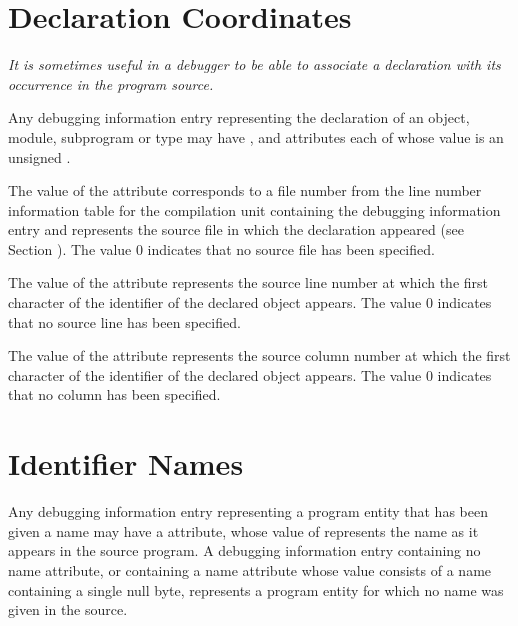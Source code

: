 \section{Declaration Coordinates}
\label{chap:declarationcoordinates}
\textit{It is sometimes useful in a debugger to be able to associate
a declaration with its occurrence in the program source.}

Any debugging information 
\hypertarget{chap:DWATdeclfilefilecontainingsourcedeclaration}{}
entry 
\hypertarget{chap:DWATdecllinelinenumberofsourcedeclaration}{}
representing 
\hypertarget{chap:DWATdeclcolumncolumnpositionofsourcedeclaration}{}
the
declaration of an object, module, subprogram or
type 
may 
have
\DWATdeclfile, 
\DWATdeclline{} and 
\DWATdeclcolumn{}
attributes each of whose value is an unsigned
.

The value of 
the 
\DWATdeclfile{}
attribute 
corresponds to
a file number from the line number information table for the
compilation unit containing the debugging information entry and
represents the source file in which the declaration appeared
(see Section ). 
The value 0 indicates that no source file
has been specified.

The value of 
the \DWATdeclline{} attribute represents
the source line number at which the first character of
the identifier of the declared object appears. The value 0
indicates that no source line has been specified.

The value of 
the \DWATdeclcolumn{} attribute represents
the source column number at which the first character of
the identifier of the declared object appears. The value 0
indicates that no column has been specified.

\section{Identifier Names}
\label{chap:identifiernames}
Any\hypertarget{chap:DWATnamenameofdeclaration}{}
debugging information entry 
representing 
a program entity that has been given a name may have a 
\DWATname{} 
attribute, whose value of 
\CLASSstring{} represents the name as it appears in
the source program. A debugging information entry containing
no name attribute, or containing a name attribute whose value
consists of a name containing a single null byte, represents
a program entity for which no name was given in the source.


